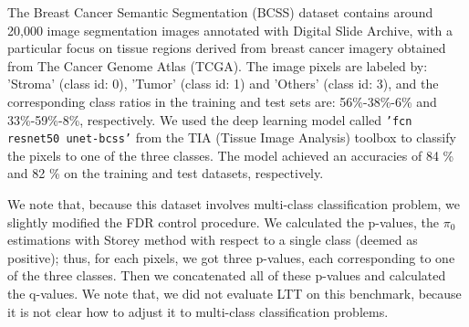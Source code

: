 \documentclass{article}
\begin{document}
The Breast Cancer Semantic Segmentation (BCSS) dataset \cite{Amgad2019StructuredCE} contains around 20,000 image segmentation images annotated with Digital Slide Archive, with a particular focus on tissue regions derived from breast cancer imagery obtained from The Cancer Genome Atlas (TCGA). The image pixels are labeled by: 'Stroma' (class id: 0), 'Tumor' (class id: 1) and 'Others' (class id: 3), and the corresponding class ratios in the training and test sets are: 56\%-38\%-6\% and 33\%-59\%-8\%, respectively. We used the deep learning model called \texttt{'fcn resnet50 unet-bcss'} from the TIA (Tissue Image Analysis) toolbox \cite{Pocock2022} to classify the pixels to one of the three classes. The model achieved an accuracies of 84 \% and 82 \% on the training and test datasets, respectively. 

We note that, because this dataset involves multi-class classification problem, we slightly modified the FDR control procedure. We calculated the p-values, the $\pi_0$ estimations with Storey method with respect to a single class (deemed as positive); thus, for each pixels, we got three p-values, each corresponding to one of the three classes. Then we concatenated all of these p-values and calculated the q-values. We note that, we did not evaluate LTT on this benchmark, because it is not clear how to adjust it to multi-class classification problems.



\end{document}
